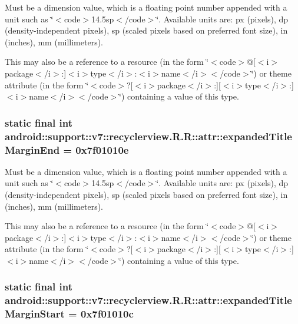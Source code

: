 Must be a dimension value, which is a floating point number appended with a unit such as \char`\"{}$<$code$>$14.5sp$<$/code$>$\char`\"{}. Available units are: px (pixels), dp (density-independent pixels), sp (scaled pixels based on preferred font size), in (inches), mm (millimeters). 

This may also be a reference to a resource (in the form \char`\"{}$<$code$>$@\mbox{[}$<$i$>$package$<$/i$>$:\mbox{]}$<$i$>$type$<$/i$>$:$<$i$>$name$<$/i$>$$<$/code$>$\char`\"{}) or theme attribute (in the form \char`\"{}$<$code$>$?\mbox{[}$<$i$>$package$<$/i$>$:\mbox{]}\mbox{[}$<$i$>$type$<$/i$>$:\mbox{]}$<$i$>$name$<$/i$>$$<$/code$>$\char`\"{}) containing a value of this type. \hypertarget{classandroid_1_1support_1_1v7_1_1recyclerview_1_1_r_1_1attr_cef261dc3a88b719942c8fce6d4b1d1a}{
\subsubsection[{expandedTitleMarginEnd}]{\setlength{\rightskip}{0pt plus 5cm}static final int android::support::v7::recyclerview.R.R::attr::expandedTitleMarginEnd = 0x7f01010e}}
\label{classandroid_1_1support_1_1v7_1_1recyclerview_1_1_r_1_1attr_cef261dc3a88b719942c8fce6d4b1d1a}


Must be a dimension value, which is a floating point number appended with a unit such as \char`\"{}$<$code$>$14.5sp$<$/code$>$\char`\"{}. Available units are: px (pixels), dp (density-independent pixels), sp (scaled pixels based on preferred font size), in (inches), mm (millimeters). 

This may also be a reference to a resource (in the form \char`\"{}$<$code$>$@\mbox{[}$<$i$>$package$<$/i$>$:\mbox{]}$<$i$>$type$<$/i$>$:$<$i$>$name$<$/i$>$$<$/code$>$\char`\"{}) or theme attribute (in the form \char`\"{}$<$code$>$?\mbox{[}$<$i$>$package$<$/i$>$:\mbox{]}\mbox{[}$<$i$>$type$<$/i$>$:\mbox{]}$<$i$>$name$<$/i$>$$<$/code$>$\char`\"{}) containing a value of this type. \hypertarget{classandroid_1_1support_1_1v7_1_1recyclerview_1_1_r_1_1attr_6f8ec3bfeb805bdc9167ffa31c8cd264}{
\subsubsection[{expandedTitleMarginStart}]{\setlength{\rightskip}{0pt plus 5cm}static final int android::support::v7::recyclerview.R.R::attr::expandedTitleMarginStart = 0x7f01010c}}
\label{classandroid_1_1support_1_1v7_1_1recyclerview_1_1_r_1_1attr_6f8ec3bfeb805bdc9167ffa31c8cd264}


